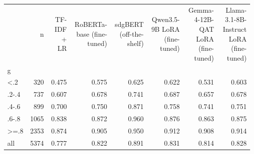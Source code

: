 \begin{tabular}{lrrrrrrr}
\toprule
 & n & TF-IDF + LR & RoBERTa-base (fine-tuned) & sdgBERT (off-the-shelf) & Qwen3.5-9B LoRA (fine-tuned) & Gemma-4-12B-QAT LoRA (fine-tuned) & Llama-3.1-8B-Instruct LoRA (fine-tuned) \\
g &  &  &  &  &  &  &  \\
\midrule
<.2 & 320 & 0.475 & 0.575 & 0.625 & 0.622 & 0.531 & 0.603 \\
.2-.4 & 737 & 0.607 & 0.678 & 0.741 & 0.687 & 0.657 & 0.678 \\
.4-.6 & 899 & 0.700 & 0.750 & 0.871 & 0.758 & 0.741 & 0.751 \\
.6-.8 & 1065 & 0.838 & 0.872 & 0.960 & 0.876 & 0.863 & 0.875 \\
>=.8 & 2353 & 0.874 & 0.905 & 0.950 & 0.912 & 0.908 & 0.914 \\
all & 5374 & 0.777 & 0.822 & 0.891 & 0.831 & 0.814 & 0.828 \\
\bottomrule
\end{tabular}

